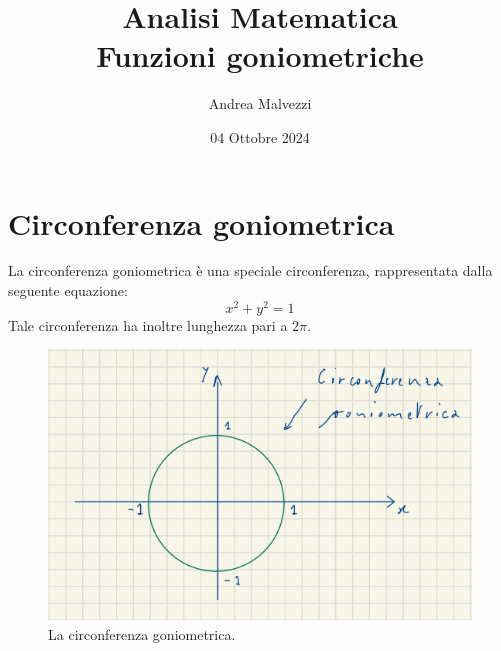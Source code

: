 \documentclass[12pt]{article}
\title{\textbf{Analisi Matematica\\Funzioni goniometriche}}
\date{04 Ottobre 2024}
\author{Andrea Malvezzi}
\begin{document}
\maketitle
\pagebreak
\tableofcontents
\pagebreak
\section{Circonferenza goniometrica}
La circonferenza goniometrica è una speciale circonferenza, rappresentata dalla seguente equazione:
\begin{equation}
    x^2 + y^2 = 1 \label{eq:circ_goniom}
\end{equation}
Tale circonferenza ha inoltre lunghezza pari a $2\pi$.
\begin{figure}[!htb]
    \centering
    \includegraphics[width=1\textwidth, height=.7\textheight,keepaspectratio]{lezione_6/circonferenza_goniometrica.PNG}
    \begin{center}
        \caption{\label{fig:circ_goniom}La circonferenza goniometrica.}
    \end{center}
\end{figure}
\pagebreak
\end{document}
